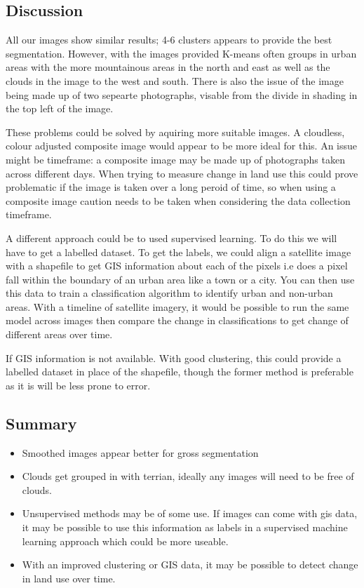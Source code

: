 \documentclass[11pt]{article}
\providecommand{\tightlist}{%
      \setlength{\itemsep}{0pt}\setlength{\parskip}{0pt}}
\begin{document}
    \subsection{Discussion}\label{discussion}

All our images show similar results; 4-6 clusters appears to provide the
best segmentation. However, with the images provided K-means often
groups in urban areas with the more mountainous areas in the north and
east as well as the clouds in the image to the west and south. There is
also the issue of the image being made up of two sepearte photographs,
visable from the divide in shading in the top left of the image.

These problems could be solved by aquiring more suitable images. A
cloudless, colour adjusted composite image would appear to be more ideal
for this. An issue might be timeframe: a composite image may be made up
of photographs taken across different days. When trying to measure
change in land use this could prove problematic if the image is taken
over a long peroid of time, so when using a composite image caution
needs to be taken when considering the data collection timeframe.

A different approach could be to used supervised learning. To do this we
will have to get a labelled dataset. To get the labels, we could align a
satellite image with a shapefile to get GIS information about each of
the pixels i.e does a pixel fall within the boundary of an urban area
like a town or a city. You can then use this data to train a
classification algorithm to identify urban and non-urban areas. With a
timeline of satellite imagery, it would be possible to run the same
model across images then compare the change in classifications to get
change of different areas over time.

If GIS information is not available. With good clustering, this could
provide a labelled dataset in place of the shapefile, though the former
method is preferable as it is will be less prone to error.

    \subsection{Summary}\label{summary}

\begin{itemize}
\tightlist
\item
  Smoothed images appear better for gross segmentation
\item
  Clouds get grouped in with terrian, ideally any images will need to be
  free of clouds.
\item
  Unsupervised methods may be of some use. If images can come with gis
  data, it may be possible to use this information as labels in a
  supervised machine learning approach which could be more useable.
\item
  With an improved clustering or GIS data, it may be possible to detect
  change in land use over time.
\end{itemize}


    
    
    
    
\end{document}
